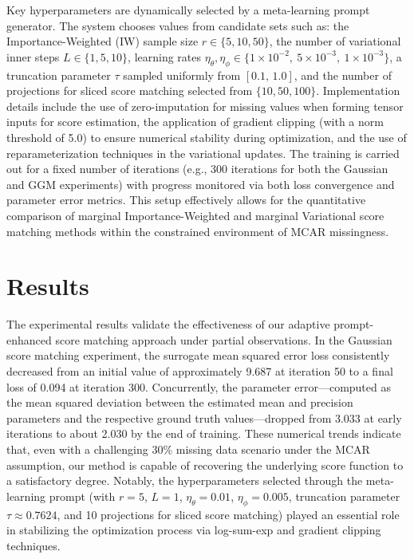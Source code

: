 \documentclass{article}
\begin{document}
Key hyperparameters are dynamically selected by a meta-learning prompt generator. The system chooses values from candidate sets such as: the Importance-Weighted (IW) sample size \(r \in \{5, 10, 50\}\), the number of variational inner steps \(L \in \{1, 5, 10\}\), learning rates \(\eta_\theta, \eta_\phi \in \{1\times10^{-2},\ 5\times10^{-3},\ 1\times10^{-3}\}\), a truncation parameter \(\tau\) sampled uniformly from \([0.1,\,1.0]\), and the number of projections for sliced score matching selected from \(\{10,50,100\}\). Implementation details include the use of zero-imputation for missing values when forming tensor inputs for score estimation, the application of gradient clipping (with a norm threshold of 5.0) to ensure numerical stability during optimization, and the use of reparameterization techniques in the variational updates. The training is carried out for a fixed number of iterations (e.g., 300 iterations for both the Gaussian and GGM experiments) with progress monitored via both loss convergence and parameter error metrics. This setup effectively allows for the quantitative comparison of marginal Importance-Weighted and marginal Variational score matching methods within the constrained environment of MCAR missingness.

\section{Results}
The experimental results validate the effectiveness of our adaptive prompt-enhanced score matching approach under partial observations. In the Gaussian score matching experiment, the surrogate mean squared error loss consistently decreased from an initial value of approximately 9.687 at iteration 50 to a final loss of 0.094 at iteration 300. Concurrently, the parameter error—computed as the mean squared deviation between the estimated mean and precision parameters and the respective ground truth values—dropped from 3.033 at early iterations to about 2.030 by the end of training. These numerical trends indicate that, even with a challenging 30\% missing data scenario under the MCAR assumption, our method is capable of recovering the underlying score function to a satisfactory degree. Notably, the hyperparameters selected through the meta-learning prompt (with \(r=5\), \(L=1\), \(\eta_\theta=0.01\), \(\eta_\phi=0.005\), truncation parameter \(\tau\approx0.7624\), and 10 projections for sliced score matching) played an essential role in stabilizing the optimization process via log-sum-exp and gradient clipping techniques.
\end{document}
